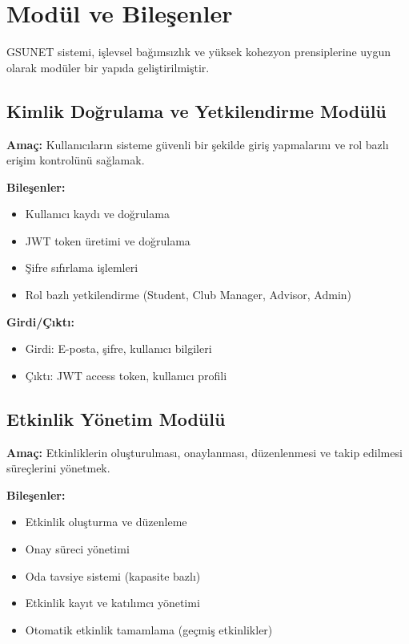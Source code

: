 \documentclass[a4paper,12pt]{report}
\begin{document}
\section{Modül ve Bileşenler}

GSUNET sistemi, işlevsel bağımsızlık ve yüksek kohezyon prensiplerine uygun olarak modüler bir yapıda geliştirilmiştir.

\subsection{Kimlik Doğrulama ve Yetkilendirme Modülü}

\textbf{Amaç:} Kullanıcıların sisteme güvenli bir şekilde giriş yapmalarını ve rol bazlı erişim kontrolünü sağlamak.

\textbf{Bileşenler:}
\begin{itemize}
    \item Kullanıcı kaydı ve doğrulama
    \item JWT token üretimi ve doğrulama
    \item Şifre sıfırlama işlemleri
    \item Rol bazlı yetkilendirme (Student, Club Manager, Advisor, Admin)
\end{itemize}

\textbf{Girdi/Çıktı:}
\begin{itemize}
    \item Girdi: E-posta, şifre, kullanıcı bilgileri
    \item Çıktı: JWT access token, kullanıcı profili
\end{itemize}

\subsection{Etkinlik Yönetim Modülü}

\textbf{Amaç:} Etkinliklerin oluşturulması, onaylanması, düzenlenmesi ve takip edilmesi süreçlerini yönetmek.

\textbf{Bileşenler:}
\begin{itemize}
    \item Etkinlik oluşturma ve düzenleme
    \item Onay süreci yönetimi
    \item Oda tavsiye sistemi (kapasite bazlı)
    \item Etkinlik kayıt ve katılımcı yönetimi
    \item Otomatik etkinlik tamamlama (geçmiş etkinlikler)
\end{itemize}
\end{document}
